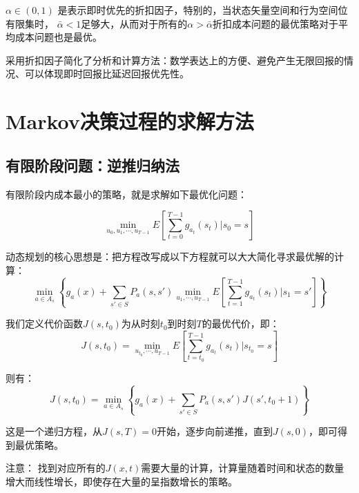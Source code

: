 \begin{note}
    $\alpha \in (0,1)$ 是表示即时优先的折扣因子，特别的，当状态矢量空间和行为空间位有限集时， $ \bar{\alpha} < 1$足够大，从而对于所有的$\alpha > \bar{\alpha}$折扣成本问题的最优策略对于平均成本问题也是最优。

    采用折扣因子简化了分析和计算方法：数学表达上的方便、避免产生无限回报的情况、可以体现即时回报比延迟回报优先性。
\end{note}

\section{Markov决策过程的求解方法}

\subsection{有限阶段问题：逆推归纳法}

有限阶段内成本最小的策略，就是求解如下最优化问题：

\begin{equation}
    \min_{u_0,u_1,\cdots,u_{T-1}}E[\sum_{t=0}^{T-1}g_{a_t}(s_t)|s_0=s]
\end{equation}

动态规划的核心思想是：把方程改写成以下方程就可以大大简化寻求最优解的计算：
\begin{equation}
    \min_{a\in A_s}\left\{ g_a(x)+\sum_{s'\in S}P_a(s,s')\min_{u_1,\cdots,u_{T-1}}E[\sum_{t=1}^{T-1}g_{a_t}(s_t)|s_1=s']\right\}
\end{equation}

我们定义代价函数$J(s,t_0)$为从时刻$t_0$到时刻$T$的最优代价，即：
\begin{equation}
    J(s,t_0)=\min_{u_{t_0},\cdots,u_{T-1}}E[\sum_{t=t_0}^{T-1}g_{a_t}(s_t)|s_{t_0}=s]
\end{equation}

则有：
\begin{equation}
    J(s,t_0)=\min_{a\in A_s}\left\{ g_a(x)+\sum_{s'\in S}P_a(s,s')J(s',t_0+1)\right\}
\end{equation}

这是一个递归方程，从$J(s,T)=0$开始，逐步向前递推，直到$J(s,0)$，即可得到最优策略。

\begin{note}
    注意： 找到对应所有的$J(x,t)$需要大量的计算，计算量随着时间和状态的数量增大而线性增长，即使存在大量的呈指数增长的策略。
\end{note}

